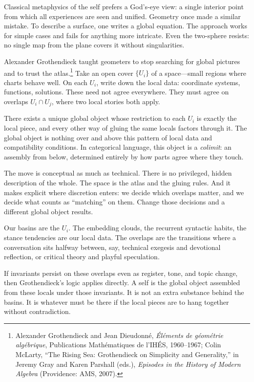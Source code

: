 \documentclass[12pt,a4paper]{article}
\begin{document}
Classical metaphysics of the self prefers a God's-eye view: a single interior point from which all experiences are seen and unified. Geometry once made a similar mistake. To describe a surface, one writes a global equation. The approach works for simple cases and fails for anything more intricate. Even the two-sphere resists: no single map from the plane covers it without singularities.

Alexander Grothendieck taught geometers to stop searching for global pictures and to trust the atlas.\footnote{Alexander Grothendieck and Jean Dieudonn\'e, \emph{\'El\'ements de g\'eom\'etrie alg\'ebrique}, Publications Math\'ematiques de l'IH\'ES, 1960--1967; Colin McLarty, ``The Rising Sea: Grothendieck on Simplicity and Generality,'' in Jeremy Gray and Karen Parshall (eds.), \emph{Episodes in the History of Modern Algebra} (Providence: AMS, 2007).} Take an open cover $\{U_i\}$ of a space---small regions where charts behave well. On each $U_i$, write down the local data: coordinate systems, functions, solutions. These need not agree everywhere. They must agree on overlaps $U_i \cap U_j$, where two local stories both apply.

There exists a unique global object whose restriction to each $U_i$ is exactly the local piece, and every other way of gluing the same locals factors through it. The global object is nothing over and above this pattern of local data and compatibility conditions. In categorical language, this object is a \emph{colimit}: an assembly from below, determined entirely by how parts agree where they touch.

The move is conceptual as much as technical. There is no privileged, hidden description of the whole. The space is the atlas and the gluing rules. And it makes explicit where discretion enters: we decide which overlaps matter, and we decide what counts as ``matching'' on them. Change those decisions and a different global object results.

Our basins are the $U_i$. The embedding clouds, the recurrent syntactic habits, the stance tendencies are our local data. The overlaps are the transitions where a conversation sits halfway between, say, technical exegesis and devotional reflection, or critical theory and playful speculation.

If invariants persist on these overlaps even as register, tone, and topic change, then Grothendieck's logic applies directly. A self is the global object assembled from these locals under those invariants. It is not an extra substance behind the basins. It is whatever must be there if the local pieces are to hang together without contradiction.
\end{document}
